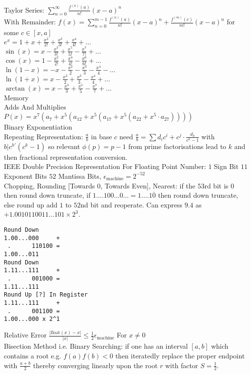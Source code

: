 \small
\twocolumn

Taylor Series: $\sum_{n=0}^{\infty} \frac{f^{(n)}(a)}{n!} (x-a)^n$ \\
With Remainder: $f(x)=\sum_{n=0}^{m-1} \frac{f^{(n)}(a)}{n!} (x-a)^n + \frac{f^{(m)}(c)}{m!} (x-a)^n$ for some $c \in [x,a]$ \\
$e^x = 1+x+\frac{x^2}{2!}+\frac{x^3}{3!}+\frac{x^4}{4!}+\dots$ \\
$\sin(x) = x-\frac{x^3}{3!}+\frac{x^5}{5!}-\frac{x^7}{7!}+\dots$ \\
$\cos(x) = 1-\frac{x^2}{2!}+\frac{x^4}{4!}-\frac{x^6}{6!}+\dots$ \\
$\ln (1-x) = -x-\frac{x^2}{2}-\frac{x^3}{3}-\frac{x^4}{4}-\dots$ \\
$\ln (1+x) = x-\frac{x^2}{2}+\frac{x^3}{3}-\frac{x^4}{4}+\dots$ \\
$\arctan (x) = x-\frac{x^3}{3}+\frac{x^5}{5}-\frac{x^7}{7}+\dots$ \\
Memory \\
Adds And Multiplies \\
$P(x)=x^7(a_7+x^5(a_{12}+x^5(a_{17}+x^5(a_{22}+x^5 \cdot a_27))))$ \\
Binary Exponentiation \\
Repeating Representation: $\frac{a}{b}$ in base $c$ need $\frac{a}{b}=\sum d_i c^i + c^j \cdot \frac{d_h}{c^k-1}$ with $b | c^{h'}(c^k-1)$ so relevant $\phi (p) = p-1$ from prime factorisations lead to $k$ and then fractional representation conversion. \\
IEEE Double Precision Representation For Floating Point Number: $1$ Sign Bit $11$ Exponent Bits $52$ Mantissa Bits, $\epsilon_{\text{machine}} = 2^{-52}$ \\
Chopping, Rounding [Towards 0, Towards Even], Nearest: if the $53$rd bit is $0$ then round down truncate, if $1.\dots 100 \dots 0 \dots = 1.\dots 1 \overline{0}$ then round down truncate, else round up add $1$ to $52$nd bit and reoperate. Can express $9.4$ as $+1.0010110011 \dots 101 \times 2^3$. \\
\begin{verbatim}
Round Down
1.00...000     +
 .      110100 =
1.00...011
Round Down
1.11...111     +
 .      001000 =
1.11...111
Round Up [?] In Register
1.11...111     +
 .      001100 =
1.00...000 x 2^1
\end{verbatim}
Relative Error $\frac{|\text{float}(x)-x|}{|x|} \le \frac{1}{2} \epsilon_{\text{machine}}$ For $x \neq 0$ \\
Bisection Method i.e. Binary Searching: if one has an interval $[a,b]$ which contains a root e.g. $f(a)f(b)<0$ then iteratedly replace the proper endpoint with $\frac{a+b}{2}$ thereby converging linearly upon the root $r$ with factor $S = \frac{1}{2}$. \\
